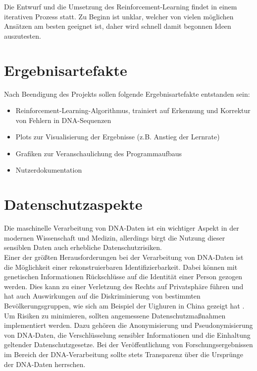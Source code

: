 \documentclass[oneside,bibliography=totocnumbered,BCOR=5mm]{scrbook}%
\theoremstyle{definition}
\theoremstyle{definition}
\theoremstyle{definition}
\theoremstyle{definition}
\theoremstyle{definition}
\theoremstyle{definition}
\begin{document}
Die Entwurf und die Umsetzung des Reinforcement-Learning findet in einem iterativen Prozess statt.
Zu Beginn ist unklar, welcher von vielen möglichen Ansätzen am besten geeignet ist, daher wird schnell
damit begonnen Ideen auszutesten. \\
\linebreak[4]

\section{Ergebnisartefakte}
Nach Beendigung des Projekts sollen folgende Ergebnisartefakte entstanden sein: \\

\begin{itemize}
  \item Reinforcement-Learning-Algorithmus, trainiert auf Erkennung und Korrektur von Fehlern in DNA-Sequenzen
  \item Plots zur Visualisierung der Ergebnisse (z.B. Anstieg der Lernrate)
  \item Grafiken zur Veranschaulichung des Programmaufbaus
  \item Nutzerdokumentation
\end{itemize}

\section{Datenschutzaspekte}
Die maschinelle Verarbeitung von DNA-Daten ist ein wichtiger Aspekt in der 
modernen Wissenschaft und Medizin, allerdings birgt die Nutzung dieser 
sensiblen Daten auch erhebliche Datenschutzrisiken. \\

Einer der größten Herausforderungen bei der Verarbeitung von DNA-Daten ist die Möglichkeit 
einer rekonstruierbaren Identifizierbarkeit. Dabei können mit genetischen Informationen 
Rückschlüsse auf die Identität einer Person gezogen werden. Dies kann zu einer Verletzung des Rechts 
auf Privatsphäre führen und hat auch Auswirkungen auf die Diskriminierung 
von bestimmten Bevölkerungsgruppen, wie sich am Beispiel der Uighuren in China gezeigt hat \autocite{chinaDNAprivacy}. \\

Um Risiken zu minimieren, sollten angemessene Datenschutzmaßnahmen implementiert werden. 
Dazu gehören die Anonymisierung und Pseudonymisierung von DNA-Daten, die Verschlüsselung sensibler Informationen 
und die Einhaltung geltender Datenschutzgesetze. 
Bei der Veröffentlichung von Forschungsergebnissen im Bereich der DNA-Verarbeitung sollte stets
Transparenz über die Ursprünge der DNA-Daten herrschen. \\
\end{document}
